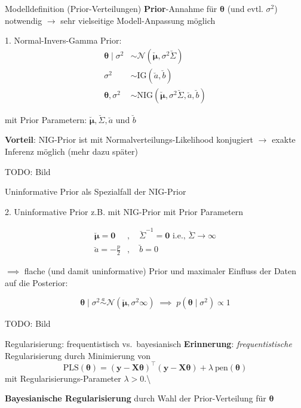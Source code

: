 \documentclass[
  ignorenonframetext,
  aspectratio=169,
]{beamer}
\newcommand{\bnull}{\bm{0}}
\newcommand{\by}{\bm{y}}
\newcommand{\bX}{\bm{X}}
\newcommand{\Ncal}{\mathcal{N}}
\newcommand{\ssd}{\sigma^2}
\newcommand{\btheta}{\bm{\theta}}
\newcommand{\mupri}{\breve{\bm{\mu}}}
\newcommand{\Sdpri}{\breve{\Sigma}}
\newcommand{\Sdipri}{\breve{\Sigma}^{-1}}
\newcommand{\apri}{\breve{a}}
\newcommand{\bpri}{\breve{b}}
\newcommand{\IG}{\text{IG}}
\begin{document}
\begin{frame}{Modelldefinition (Prior-Verteilungen)}
\protect{}\label{modelldefinition-prior-verteilungen}
\textbf{Prior}-Annahme für \(\btheta\) (und evtl. \(\ssd\)) notwendig
\(\to\) sehr vielseitige Modell-Anpassung möglich

\begin{block}{1. Normal-Invers-Gamma Prior:}
\protect{}\label{normal-invers-gamma-prior}
\[
\begin{aligned}
  \btheta \mid \ssd &\sim  \Ncal(\mupri, \ssd \Sdpri) \\
  \ssd &\sim \IG(\apri, \bpri) \\
  \btheta, \ssd &\sim \text{NIG}(\mupri, \ssd \Sdpri, \apri, \bpri)
\end{aligned}
\]

mit Prior Parametern: \(\mupri, \Sdpri, \apri\) und \(\bpri\)
\end{block}

\textbf{Vorteil}: NIG-Prior ist mit Normalverteilungs-Likelihood
konjugiert \(\to\) exakte Inferenz möglich (mehr dazu später)

TODO: Bild
\end{frame}

\begin{frame}{Uninformative Prior als Spezialfall der NIG-Prior}
\protect{}\label{uninformative-prior-als-spezialfall-der-nig-prior}
\begin{block}{2. Uninformative Prior}
\protect{}\label{uninformative-prior}
z.B. mit NIG-Prior mit Prior Parametern

\[
\begin{aligned}
\mupri = \bnull&, \quad \Sdipri = \bnull \text{  i.e., } \Sdpri \to \infty \\
\apri = - \frac{p}{2}&, \quad \bpri = 0
\end{aligned}
\]

\(\implies\) flache (und damit uninformative) Prior und maximaler
Einfluss der Daten auf die Posterior:

\[
\btheta \mid \ssd \overset{a}{\sim}  \Ncal(\mupri, \ssd \infty) \; \implies \; p(\btheta\mid \ssd) \propto 1
\]
\end{block}

TODO: Bild
\end{frame}

\begin{frame}{Regularisierung: frequentistisch vs.~bayesianisch}
\protect{}\label{regularisierung-frequentistisch-vs.-bayesianisch}
\textbf{Erinnerung}: \emph{frequentistische} Regularisierung durch
Minimierung von
\[\text{PLS}(\btheta) = (\by - \bX \btheta)^\top (\by - \bX \btheta) + \lambda \ \text{pen}(\btheta)\]
mit Regularisierungs-Parameter \(\lambda > 0\).\textbackslash{}

\textbf{Bayesianische Regularisierung} durch Wahl der Prior-Verteilung
für \(\btheta\)
\end{frame}
\end{document}
